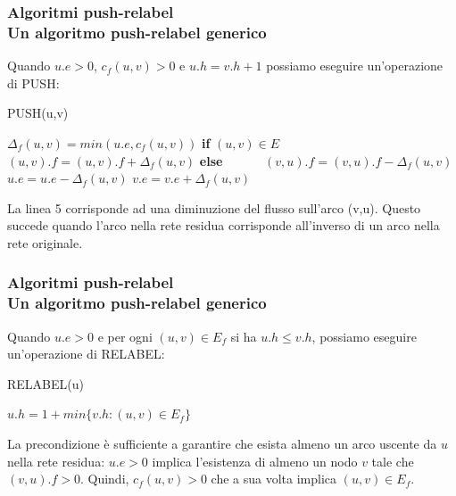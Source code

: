 \documentclass{beamer}
\begin{document}
\begin{frame}
\frametitle{Algoritmi push-relabel\\Un algoritmo push-relabel generico}
Quando $u.e>0$, $c_f(u,v)>0$ e $u.h=v.h+1$ possiamo eseguire un'operazione di PUSH:
\begin{algorithm}[H]
    \caption{PUSH(u,v)}%
    \begin{algorithmic}[1]
        \State $\Delta_f(u,v)=min(u.e,c_f(u,v))$
        \State \textbf{if} $(u,v)\in E$
        \State \ \ \ \ \ \ $(u,v).f = (u,v).f+\Delta_f(u,v)$
        \State \textbf{else}
        \State \ \ \ \ \ \ $(v,u).f = (v,u).f-\Delta_f(u,v)$
        \State $u.e=u.e-\Delta_f(u,v)$
        \State $v.e=v.e+\Delta_f(u,v)$
    \end{algorithmic}
    \label{alg_1}
\end{algorithm}
La linea 5 corrisponde ad una diminuzione del flusso sull'arco (v,u). Questo succede quando l'arco nella rete residua corrisponde all'inverso di un arco nella rete originale.
\end{frame}

\begin{frame}
\frametitle{Algoritmi push-relabel\\Un algoritmo push-relabel generico}
Quando $u.e>0$ e per ogni $(u,v)\in E_f$ si ha $u.h\leq v.h$, possiamo eseguire un'operazione di RELABEL:
\begin{algorithm}[H]
    \caption{RELABEL(u)}%
    \begin{algorithmic}[1]
        \State $u.h=1+min\{v.h:(u,v)\in E_f\}$
    \end{algorithmic}
    \label{alg_1}
\end{algorithm}
La precondizione è sufficiente a garantire che esista almeno un arco uscente da $u$ nella rete residua: $u.e>0$ implica l'esistenza di almeno un nodo $v$ tale che $(v,u).f>0$. Quindi, $c_f(u,v)>0$ che a sua volta implica $(u,v)\in E_f$.
\end{frame}
\end{document}
